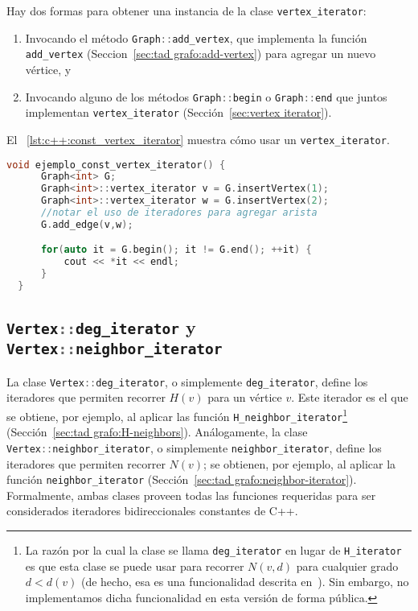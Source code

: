 \documentclass[%
    a4paper,%
    fontsize=12pt,%
    DIV=12,
    twoside,%
    openright,%
    titlepage=true,%
    headsepline,%
    toc=bibliography,%
    parskip=half,%
    cleardoublepage=empty,%
    headings=big,%
]{scrbook}
\makeatletter
\newcommand{\Code}[1]{\lstinline[basicstyle={\ttfamily}]@#1@}
\newcommand{\CPPCode}[1]{\lstinline[language=C++,basicstyle={\ttfamily}]@#1@}
\DeclareRobustCommand{\CPP}{C\nolinebreak[4]\hspace{-.05em}\raisebox{.4ex}{\relsize{-3}\textbf{++}}\xspace}
\def\CPP{C++}%
\makeatother
\begin{document}
Hay dos formas para obtener una instancia de la clase \CPPCode{vertex_iterator}:
\begin{enumerate}[1.]
  \item Invocando el método \CPPCode{Graph::add_vertex}, que implementa la función \Code{add_vertex} (Seccion~\ref{sec:tad grafo:add-vertex}) para agregar un nuevo vértice, y
  \item Invocando alguno de los métodos \CPPCode{Graph::begin} o \CPPCode{Graph::end} que juntos implementan \Code{vertex_iterator} (Sección~\ref{sec:vertex iterator}).
\end{enumerate}
El \lstlistingname~\ref{lst:c++:const_vertex_iterator} muestra cómo usar un \CPPCode{vertex_iterator}.


\begin{lstlisting}[caption={Ejemplo de uso de \CPPCode{vertex_iterator} para manipular el grafo.  En el ejemplo, se crean dos vértices unidos por una arista y se imprimen los dos vértices.},name=const_vertex_iterator,gobble=2,float=ht,label={lst:c++:const_vertex_iterator},language=C++]
  void ejemplo_const_vertex_iterator() {
      Graph<int> G;
      Graph<int>::vertex_iterator v = G.insertVertex(1);
      Graph<int>::vertex_iterator w = G.insertVertex(2);
      //notar el uso de iteradores para agregar arista
      G.add_edge(v,w);

      for(auto it = G.begin(); it != G.end(); ++it) {
          cout << *it << endl;
      }
  }
\end{lstlisting}

\subsection{\texorpdfstring{\protect\CPPCode{Vertex::deg_iterator}}{Vertex::deg\_iterator} y \texorpdfstring{\protect\CPPCode{Vertex::neighbor_iterator}}{Vertex::neighbor\_iterator}}
\label{sec:deg_iterator}

La clase \CPPCode{Vertex::deg_iterator}, o simplemente \CPPCode{deg_iterator}, define los iteradores que permiten recorrer $H(v)$ para un vértice $v$. Este iterador es el que se obtiene, por ejemplo, al aplicar las función \Code{H_neighbor_iterator}\footnote{La razón por la cual la clase se llama \CPPCode{deg_iterator} en lugar de \CPPCode{H_iterator} es que esta clase se puede usar para recorrer $N(v, d)$ para cualquier grado $d < d(v)$ (de hecho, esa es una funcionalidad descrita en~\cite{LinSoulignacSzwarcfiterTCS2012}).  Sin embargo, no implementamos dicha funcionalidad en esta versión de forma pública.} (Sección~\ref{sec:tad grafo:H-neighbors}).  Análogamente, la clase \CPPCode{Vertex::neighbor_iterator}, o simplemente \CPPCode{neighbor_iterator}, define los iteradores que permiten recorrer $N(v)$; se obtienen, por ejemplo, al aplicar la función \Code{neighbor_iterator} (Sección~\ref{sec:tad grafo:neighbor-iterator}).  Formalmente, ambas clases proveen todas las funciones requeridas para ser considerados iteradores bidireccionales constantes de \CPP.
\end{document}
